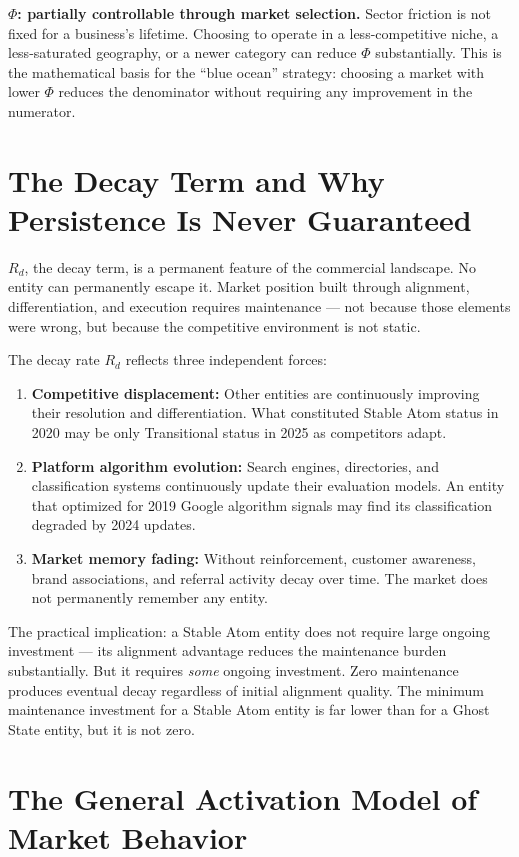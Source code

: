 \documentclass[12pt, openany]{book}
\theoremstyle{thmstyle}
\theoremstyle{defstyle}
\begin{document}
\textbf{$\Phi$: partially controllable through market selection.} Sector friction is not fixed for a business's lifetime. Choosing to operate in a less-competitive niche, a less-saturated geography, or a newer category can reduce $\Phi$ substantially. This is the mathematical basis for the ``blue ocean'' strategy: choosing a market with lower $\Phi$ reduces the denominator without requiring any improvement in the numerator.

\section{The Decay Term and Why Persistence Is Never Guaranteed}

$R_d$, the decay term, is a permanent feature of the commercial landscape. No entity can permanently escape it. Market position built through alignment, differentiation, and execution requires maintenance --- not because those elements were wrong, but because the competitive environment is not static.

The decay rate $R_d$ reflects three independent forces:
\begin{enumerate}[leftmargin=1.5em]
  \item \textbf{Competitive displacement:} Other entities are continuously improving their resolution and differentiation. What constituted Stable Atom status in 2020 may be only Transitional status in 2025 as competitors adapt.
  \item \textbf{Platform algorithm evolution:} Search engines, directories, and classification systems continuously update their evaluation models. An entity that optimized for 2019 Google algorithm signals may find its classification degraded by 2024 updates.
  \item \textbf{Market memory fading:} Without reinforcement, customer awareness, brand associations, and referral activity decay over time. The market does not permanently remember any entity.
\end{enumerate}

The practical implication: a Stable Atom entity does not require large ongoing investment --- its alignment advantage reduces the maintenance burden substantially. But it requires \textit{some} ongoing investment. Zero maintenance produces eventual decay regardless of initial alignment quality. The minimum maintenance investment for a Stable Atom entity is far lower than for a Ghost State entity, but it is not zero.

\section{The General Activation Model of Market Behavior}
\end{document}
